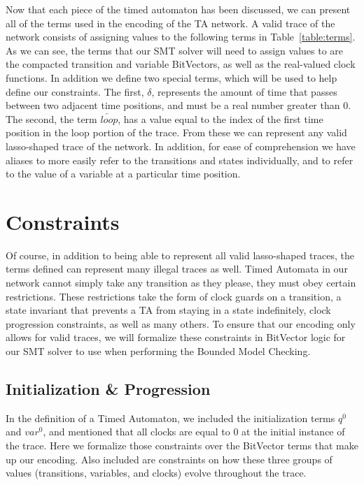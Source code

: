 \documentclass[a4paper,11pt]{report}
\theoremstyle{definition}
\begin{document}
Now that each piece of the timed automaton has been discussed, we can present
all of the terms used in the encoding of the TA network. A valid trace of the
network consists of assigning values to the following terms in
Table~\ref{table:terms}. As we can see, the terms that our SMT solver will need
to assign values to are the compacted transition and variable BitVectors, as
well as the real-valued clock functions. In addition we define two special
terms, which will be used to help define our constraints. The first, \(\delta\),
represents the amount of time that passes between two adjacent time positions,
and must be a real number greater than 0. The second, the term
\(\overleftarrow{loop}\), has a value equal to the index of the first time
position in the loop portion of the trace. From these we can represent any valid
lasso-shaped trace of the network. In addition, for ease of comprehension we
have aliases to more easily refer to the transitions and states individually,
and to refer to the value of a variable at a particular time position.


\section{Constraints}\label{constraints}

Of course, in addition to being able to represent all valid lasso-shaped traces,
the terms defined can represent many illegal traces as well. Timed Automata in
our network cannot simply take any transition as they please, they must obey
certain restrictions. These restrictions take the form of clock guards on a
transition, a state invariant that prevents a TA from staying in a state
indefinitely, clock progression constraints, as well as many others. To ensure
that our encoding only allows for valid traces, we will formalize these
constraints in BitVector logic for our SMT solver to use when performing the
Bounded Model Checking.

\subsection{Initialization \& Progression}\label{constraints-init}

In the definition of a Timed Automaton, we included the initialization terms
\(q^{0}\) and \(var^{0}\), and mentioned that all clocks are equal to 0 at the
initial instance of the trace. Here we formalize those constraints over the
BitVector terms that make up our encoding. Also included are constraints on how
these three groups of values (transitions, variables, and clocks) evolve
throughout the trace.
\end{document}
